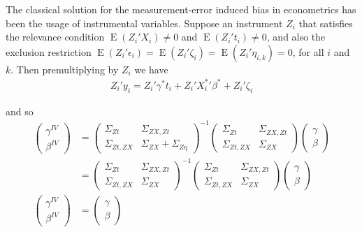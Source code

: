 \documentclass[12pt]{article}
\begin{document}
The classical solution for the measurement-error induced bias in econometrics has been the usage of instrumental variables. Suppose an instrument $Z_i$ that satisfies the relevance condition $\operatorname{E}(Z_i'X_i)\neq 0$ and $\operatorname{E}(Z_i't_i)\neq 0$, and also the exclusion restriction $\operatorname{E}(Z_i'\epsilon_i)=\operatorname{E}(Z_i'\zeta_i)=\operatorname{E}(Z_i'\eta_{i,k})=0$, for all $i$ and $k$. Then premultiplying by $Z_i$ we have
\begin{align}
    Z_i'y_i =  Z_i'\gamma^* t_i +  Z_i'{X^{*}_i}' \beta^* +  Z_i'\zeta_i
\end{align}

and so
\begin{align}
    \left(\begin{array}{l}
{\gamma}^{IV} \\
{\beta}^{IV}
\end{array}\right)
& =\left(\begin{array}{cc}
{\Sigma}_{Zt} & \Sigma_{ZX,Zt} \\
\Sigma_{Zt,ZX}& {\Sigma}_{ZX}+{\Sigma}_{Z\eta}
\end{array}\right)^{-1}\left(\begin{array}{cc}
{\Sigma}_{Zt} & \Sigma_{ZX,Zt} \\
\Sigma_{Zt,ZX} & {\Sigma}_{ZX}
\end{array}\right)\left(\begin{array}{l}
{\gamma} \\
{\beta}
\end{array}\right)\\
& =\left(\begin{array}{cc}
{\Sigma}_{Zt} & \Sigma_{ZX,Zt} \\
\Sigma_{Zt,ZX}& {\Sigma}_{ZX}
\end{array}\right)^{-1}\left(\begin{array}{cc}
{\Sigma}_{Zt} & \Sigma_{ZX,Zt} \\
\Sigma_{Zt,ZX} & {\Sigma}_{ZX}
\end{array}\right)\left(\begin{array}{l}
{\gamma} \\
{\beta}
\end{array}\right) \\
\left(\begin{array}{l}
{\gamma}^{IV} \\
{\beta}^{IV}
\end{array}\right)
& =\left(\begin{array}{l}
{\gamma} \\
{\beta}
\end{array}\right)
\end{align}
\end{document}
